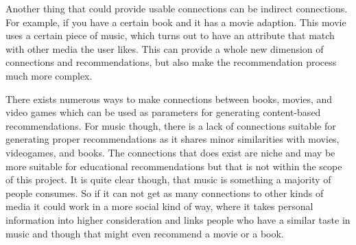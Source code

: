 Another thing that could provide usable connections can be indirect connections. For example, if you have a certain book and it has a movie adaption. This movie uses a certain piece of music, which turns out to have an attribute that match with other media the user likes. This can provide a whole new dimension of connections and recommendations, but also make the recommendation process much more complex.

There exists numerous ways to make connections between books, movies, and video games which can be used as parameters for generating content-based recommendations. For music though, there is a lack of connections suitable for generating proper recommendations as it shares minor similarities with movies, videogames, and books. The connections that does exist are niche and may be more suitable for educational recommendations but that is not within the scope of this project. It is quite clear though, that music is something a majority of people consumes. So if it can not get as many connections to other kinds of media it could work in a more social kind of way, where it takes personal information into higher consideration and links people who have a similar taste in music and though that might even recommend a movie or a book.